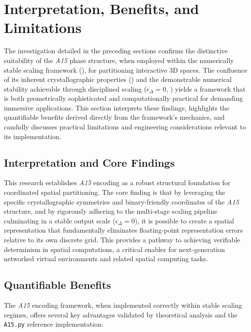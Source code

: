 \documentclass[10pt]{article}
\def\AAAB{\textit{A15}}
\begin{document}
\section{Interpretation, Benefits, and Limitations}\label{sec-discussion}

The investigation detailed in the preceding sections confirms the distinctive suitability of the \AAAB{} phase structure, when employed within the numerically stable scaling framework (), for partitioning interactive 3D spaces. The confluence of its inherent crystallographic properties () and the demonstrable numerical stability achievable through disciplined scaling ($\epsilon_\Delta = 0$, ) yields a framework that is both geometrically sophisticated and computationally practical for demanding immersive applications. This section interprets these findings, highlights the quantifiable benefits derived directly from the framework's mechanics, and candidly discusses practical limitations and engineering considerations relevant to its implementation.

\subsection{Interpretation and Core Findings}\label{subsec-discussion-interpretation}

This research establishes \AAAB{} encoding as a robust structural foundation for coordinated spatial partitioning. The core finding is that by leveraging the specific crystallographic symmetries and binary-friendly coordinates of the \AAAB{} structure, and by rigorously adhering to the multi-stage scaling pipeline culminating in a stable output scale ($\epsilon_\Delta = 0$), it is possible to create a spatial representation that fundamentally eliminates floating-point representation errors relative to its own discrete grid. This provides a pathway to achieving verifiable determinism in spatial computations, a critical enabler for next-generation networked virtual environments and related spatial computing tasks.

\subsection{Quantifiable Benefits}\label{subsec-discussion-benefits}

The \AAAB{} encoding framework, when implemented correctly within stable scaling regimes, offers several key advantages validated by theoretical analysis and the \texttt{A15.py} \cite{Risinger2024A15} reference implementation:
\end{document}
